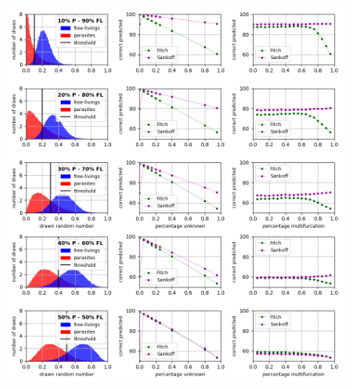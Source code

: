     \begin{figure}[h!]
      \centering
      \includegraphics[trim = 0mm 100mm 0mm 0mm, clip, width=\textwidth]{Figures/simulation_evaluation_1.png}
    \end{figure}
    ~ \\
